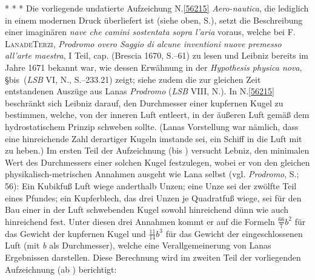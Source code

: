 %
%
%
%
\pend%
\vspace{2.0em}%
\pstart%
\noindent%
\centering%
*     *     *
\pend%
\vspace{2.0em}%
%
\frenchspacing%
\footnotesize%
\pstart%
\noindent%
%
Die vorliegende undatierte Aufzeichung N.\;\ref{56215} \textit{Aero-nautica}, die lediglich in einem modernen Druck überliefert ist (siehe oben, S.\;\pageref{Gerland_1906_007-009_uebrlf}), setzt die Beschreibung einer imaginären \textit{nave che camini sostentata sopra l'aria} voraus, welche bei F.\,\textsc{Lana\:de\:Terzi}, \textit{Prodromo overo Saggio di alcune inventioni nuove premesso all'arte maestra}, I Teil, cap. (Brescia 1670, S.--61)\cite{00069} zu lesen und Leibniz bereits im Jahre 1671 bekannt war,
wie dessen Erwähnung in der \textit{Hypothesis physica nova}, §\;\lbrack bis\rbrack\ (\textit{LSB} VI, N., S.--233.21)\cite{00256} zeigt;
siehe zudem die zur gleichen Zeit entstandenen Auszüge aus Lanas \textit{Prodromo} (\textit{LSB} VIII, N.).\cite{01103}
In N.\;\ref{56215} beschränkt sich Leibniz darauf, den Durchmesser einer kupfernen Kugel zu bestimmen, welche, von der inneren Luft entleert, in der äußeren Luft gemäß dem hydrostatischem Prinzip schweben sollte.
(Lanas Vorstellung war nämlich, dass eine hinreichende Zahl derartiger Kugeln imstande sei, ein Schiff in die Luft mit zu heben.)
Im ersten Teil der Aufzeichnung (bis ) versucht Lebniz, den minimalen Wert des Durchmessers einer solchen Kugel festzulegen, wobei er von den gleichen physikalisch-metrischen Annahmen ausgeht wie Lana selbst (vgl. \textit{Prodromo},\cite{00069} S.; 56):
Ein Kubikfuß Luft wiege anderthalb Unzen;
eine Unze sei der zwölfte Teil eines Pfundes;
ein Kupferblech, das drei Unzen je Quadratfuß wiege, sei für den Bau einer in der Luft schwebenden Kugel sowohl hinreichend dünn wie auch hinreichend fest.
Unter diesen drei Annahmen kommt er auf die Formeln $\displaystyle\frac{66}{7}b^2$ für das Gewicht der kupfernen Kugel und $\displaystyle\frac{11}{14}b^3$ für das Gewicht der eingeschlossenen Luft (mit \textit{b} als Durchmesser), welche eine Verallgemeinerung von Lanas Ergebnissen darstellen.
\pend%
\pstart%
Diese Berechnung wird im zweiten Teil der vorliegenden Aufzeichnung (ab ) berichtigt:
